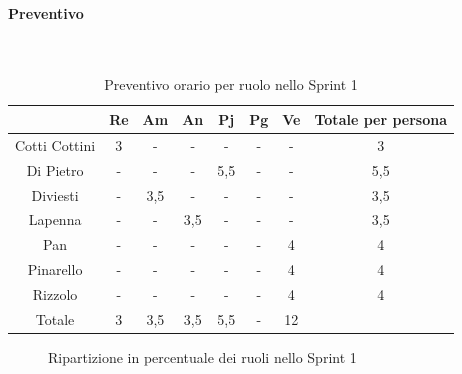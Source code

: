 \documentclass{article}
\begin{document}
                \paragraph{Preventivo}\mbox{}\\
                \begin{table}[H]
                    \centering
                    \begin{tabular}{|c|c|c|c|c|c|c|c|}
                    \hline
                                  & Re  & Am  & An  & Pj  & Pg  & Ve  & Totale per persona \\ \hline
                    Cotti Cottini & 3   & -   & -   & -   & -   & -   & 3                  \\ \hline
                    Di Pietro     & -   & -   & -   & 5,5 & -   & -   & 5,5                \\ \hline
                    Diviesti      & -   & 3,5 & -   & -   & -   & -   & 3,5                \\ \hline
                    Lapenna       & -   & -   & 3,5 & -   & -   & -   & 3,5                \\ \hline
                    Pan           & -   & -   & -   & -   & -  & 4   & 4                 \\ \hline
                    Pinarello     & -   & -   & -   & -   & -   & 4   & 4                  \\ \hline
                    Rizzolo       & -   & -   & -   & -   & -   & 4   & 4                  \\ \hline
                    Totale        & 3   & 3,5 & 3,5 & 5,5 & -  & 12  &                    \\ \hline
                    \end{tabular}
                    \caption{Preventivo orario per ruolo nello Sprint 1}
                \end{table}


                \begin{figure}[H]
                    \centering
                    \caption{Ripartizione in percentuale dei ruoli nello Sprint 1}
                \end{figure}
\end{document}
